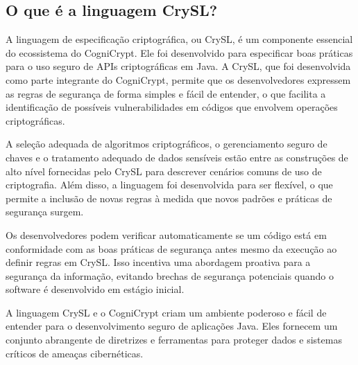 

\subsection{O que é a linguagem CrySL?} %

A linguagem de especificação criptográfica, ou CrySL, é um componente essencial do ecossistema do CogniCrypt. Ele foi desenvolvido para especificar boas práticas para o uso seguro de APIs criptográficas em Java. A CrySL, que foi desenvolvida como parte integrante do CogniCrypt, permite que os desenvolvedores expressem as regras de segurança de forma simples e fácil de entender, o que facilita a identificação de possíveis vulnerabilidades em códigos que envolvem operações criptográficas. \cite{CogniCrypt}

A seleção adequada de algoritmos criptográficos, o gerenciamento seguro de chaves e o tratamento adequado de dados sensíveis estão entre as construções de alto nível fornecidas pelo CrySL para descrever cenários comuns de uso de criptografia. Além disso, a linguagem foi desenvolvida para ser flexível, o que permite a inclusão de novas regras à medida que novos padrões e práticas de segurança surgem. \cite{CogniCrypt}

Os desenvolvedores podem verificar automaticamente se um código está em conformidade com as boas práticas de segurança antes mesmo da execução ao definir regras em CrySL. Isso incentiva uma abordagem proativa para a segurança da informação, evitando brechas de segurança potenciais quando o software é desenvolvido em estágio inicial. \cite{CogniCrypt}

A linguagem CrySL e o CogniCrypt criam um ambiente poderoso e fácil de entender para o desenvolvimento seguro de aplicações Java. Eles fornecem um conjunto abrangente de diretrizes e ferramentas para proteger dados e sistemas críticos de ameaças cibernéticas. \cite{CogniCrypt}



